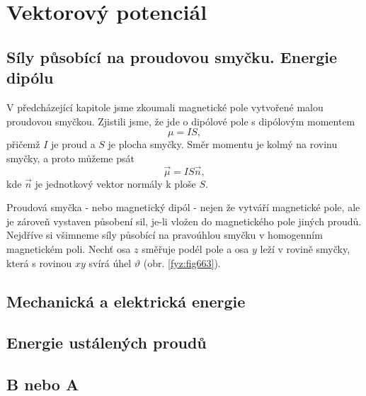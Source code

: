 \setchaptertoc
\chapter{Vektorový potenciál}\label{fyz:IIchapXV}

  \section{Síly působící na proudovou smyčku. Energie dipólu}\label{fyz:IIchapXVsecI}
    V předcházející kapitole jsme zkoumali magnetické pole vytvořené malou proudovou smyč­kou.
    Zjistili jsme, že jde o dipólové pole s dipólovým momentem
    \begin{equation}\label{fyz:eq585}
      \mu = I S,
    \end{equation}
    přičemž \(I\) je proud a \(S\) je plocha smyčky. Směr momentu je kolmý na rovinu smyčky, a proto
    můžeme psát
    \begin{equation}\label{fyz:eq586}
      \vec{\mu} = I S\vec{n},
    \end{equation}
    kde \(\vec{n}\) je jednotkový vektor normály k ploše \(S\).

    Proudová smyčka - nebo magnetický dipól - nejen že vytváří magnetické pole, ale je zároveň
    vystaven působení sil, je-li vložen do magnetického pole jiných proudů. Nejdříve si všimneme
    síly působící na pravoúhlou smyčku v homogenním magnetickém poli. Nechť osa \(z\) směřuje podél
    pole a osa \(y\) leží v rovině smyčky, která s rovinou \(xy\) svírá úhel \(\vartheta\) (obr.
    \ref{fyz:fig663}). 

  \section{Mechanická a elektrická energie}\label{fyz:IIchapXVsecII}
  \section{Energie ustálených proudů}\label{fyz:IIchapXVsecIII}
  \section{B nebo A}\label{fyz:IIchapXVsecIV}
